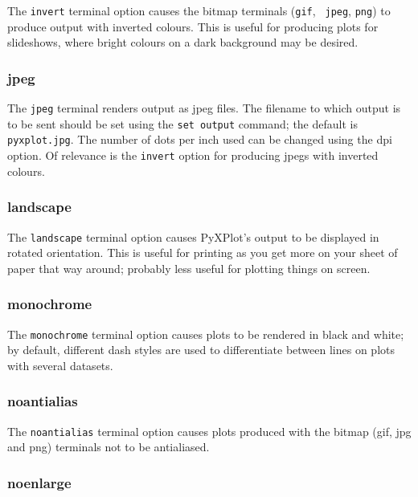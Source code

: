 The {\tt invert} terminal option causes the bitmap terminals ({\tt gif}, {\tt
jpeg}, {\tt png}) to produce output with inverted colours. This is useful for
producing plots for slideshows, where bright colours on a dark background may be
desired.


\subsubsection{jpeg}

The {\tt jpeg} terminal renders output as jpeg files. The filename to which
output is to be sent should be set using the {\tt set output} command; the
default is {\tt pyxplot.jpg}.  The number of dots per inch used can be changed
using the dpi option. Of relevance is the {\tt invert} option for producing
jpegs with inverted colours.

\subsubsection{landscape}

The {\tt landscape} terminal option causes PyXPlot's output to be displayed in
rotated orientation.  This is useful for printing as you get more on your sheet
of paper that way around; probably less useful for plotting things on screen.

\subsubsection{monochrome}

The {\tt monochrome} terminal option causes plots to be rendered in black and
white; by default, different dash styles are used to differentiate between
lines on plots with several datasets.

\subsubsection{noantialias}

The {\tt noantialias} terminal option causes plots produced with the bitmap
(gif, jpg and png) terminals not to be antialiased.

\subsubsection{noenlarge}

